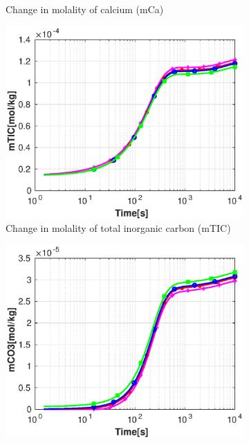 \begin{figure}[!h]
\begin{subfigure}{.5\linewidth}
        \caption{Change in molality of calcium (mCa)}
        \label{fig:withoutpHmCa}
    \end{subfigure}%
    \hfill
    \begin{subfigure}{.5\linewidth}
            \centering
        \includegraphics[width=\textwidth]{PICTURES/without_pH_mTIC.eps}
        \caption{Change in molality of total inorganic carbon (mTIC)}
        \label{fig:withoutpHmTIC}
    \end{subfigure}%
    \hfill
    \begin{subfigure}{.5\linewidth}
            \centering
        \includegraphics[width=\textwidth]{PICTURES/without_pH_mCO3.eps}

\end{subfigure}
\end{figure}

